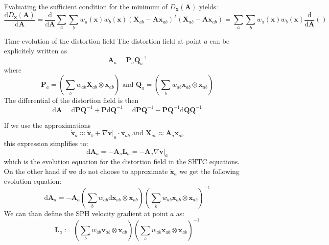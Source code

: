 \documentclass[oneside, a4paper, onecolumn, 11pt]{article}
\renewcommand{\AA}{\mathbf{A}}
\newcommand{\PP}{\mathbf{P}}
\newcommand{\vv}{\mathbf{v}}
\newcommand{\xx}{\mathbf{x}}
\newcommand{\XX}{\mathbf{X}}
\newcommand{\diff}{\mathrm{d}}
\newcommand{\QQ}{\mathbf{Q}}
\newcommand{\LL}{\mathbf{L}}
\begin{document}
Evaluating the sufficient condition for the minimum of $D_{\xx}(\AA)$ yields:
\begin{equation}
    \frac{\diff D_{\xx}(\AA)}{\diff \AA} = \frac{\diff}{\diff\AA} \sum_a \sum_b w_a(\xx) w_b(\xx) \left( \XX_{ab} - \AA \xx_{ab} \right)^T \left( \XX_{ab} - \AA \xx_{ab} \right) =
    \sum_a \sum_b w_a(\xx) w_b(\xx) \frac{\diff}{\diff \AA} \left(
    \right)
\end{equation}
\begin{subsection} {Time evolution of the distortion field}
The distortion field at point $a$ can be explicitely written as \begin{equation}
    \AA_a = \PP_a \QQ_a^{-1}
\end{equation}
where \begin{equation}
    \PP_a = \left( \sum_b w_{ab} \XX_{ab} \otimes \xx_{ab} \right) \text{ and }
    \QQ_a =  \left( \sum_b w_{ab} \xx_{ab} \otimes \xx_{ab} \right)
\end{equation}
The differential of the distortion field is then \begin{equation}
    \diff \AA = \diff \PP \QQ^{-1} + \PP \diff \QQ^{-1} =
    \diff \PP \QQ^{-1} - \PP \QQ^{-1} \diff \QQ \QQ^{-1} 
\end{equation}

If we use the approximations \begin{equation}
    \dot{\xx}_a \approx \dot{\xx}_b + \nabla \vv \Big|_a \cdot \xx_{ab} \text{ and } 
    \XX_{ab} \approx \AA_a \xx_{ab}
\end{equation} 
this expression simplifies to: 
\begin{equation}
    \diff \AA_a = - \AA_a \LL_a = - \AA_a \nabla \vv \Big|_a
\end{equation}
which is the evolution equation for the distortion field in the SHTC equations.\\
On the other hand if we do not choose to approximate $\dot{\xx}_a$ we get the following evolution equation: 
\begin{equation}
    \diff \AA_a = - \AA_a \left( \sum_b w_{ab} \diff \xx_{ab} \otimes \xx_{ab}\right)
    \left( \sum_b w_{ab} \xx_{ab} \otimes \xx_{ab}\right)^{-1}
\end{equation}
We can than define the SPH velocity gradient at point $a$ as: 
\begin{equation}
    \LL_a := \left( \sum_b w_{ab} \vv_{ab} \otimes \xx_{ab}\right)
    \left( \sum_b w_{ab} \xx_{ab} \otimes \xx_{ab}\right)^{-1}
\end{equation}


\end{subsection}
\end{document}
